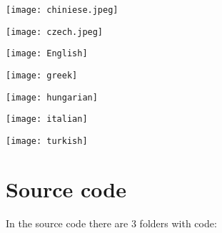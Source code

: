 \documentclass[12pt, a4paper]{article}
\begin{document}
  \begin{minipage}[t]{\linewidth}
    \texttt{[image: chiniese.jpeg]}
    \captionsetup{type=figure}
    \label{fig:chinese}
  \end{minipage}

  \begin{minipage}[t]{\linewidth}
    \texttt{[image: czech.jpeg]}
    \captionsetup{type=figure}
    \label{fig:czech}
  \end{minipage}

  \begin{minipage}[t]{\linewidth}
    \texttt{[image: English]}
    \captionsetup{type=figure}
    \label{fig:english}
  \end{minipage}

  \begin{minipage}[t]{\linewidth}
    \texttt{[image: greek]}
    \captionsetup{type=figure}
    \label{fig:greek}
  \end{minipage}

  \begin{minipage}[t]{\linewidth}
    \texttt{[image: hungarian]}
    \captionsetup{type=figure}
    \label{fig:hungarian}
  \end{minipage}

  \begin{minipage}[t]{\linewidth}
    \texttt{[image: italian]}
    \captionsetup{type=figure}
    \label{fig:italian}
  \end{minipage}

  \begin{minipage}[t]{\linewidth}
    \texttt{[image: turkish]}
    \captionsetup{type=figure}
    \label{fig:turksh}
  \end{minipage}


\section{Source code}
In the source code there are 3 folders with code:
\end{document}
